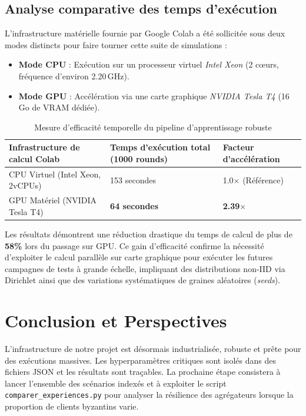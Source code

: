 \documentclass[11pt, a4paper]{article}
\begin{document}
\subsection{Analyse comparative des temps d'exécution}
L'infrastructure matérielle fournie par Google Colab a été sollicitée sous deux modes distincts pour faire tourner cette suite de simulations :
\begin{itemize}
    \item \textbf{Mode CPU} : Exécution sur un processeur virtuel \textit{Intel Xeon} (2 cœurs, fréquence d'environ 2.20\,GHz).
    \item \textbf{Mode GPU} : Accélération via une carte graphique \textit{NVIDIA Tesla T4} (16\,Go de VRAM dédiée).
\end{itemize}

\begin{table}[h]
\centering
\begin{tabularx}{\textwidth}{@{}lXX@{}}
\toprule
\textbf{Infrastructure de calcul Colab} & \textbf{Temps d'exécution total (1000 rounds)} & \textbf{Facteur d'accélération} \\ \midrule
CPU Virtuel (Intel Xeon, 2vCPUs)        & 153 secondes                                   & 1.0$\times$ (Référence)         \\ \addlinespace
GPU Matériel (NVIDIA Tesla T4)          & \textbf{64 secondes}                           & \textbf{2.39$\times$}           \\ \bottomrule
\end{tabularx}
\caption{Mesure d'efficacité temporelle du pipeline d'apprentissage robuste}
\end{table}

Les résultats démontrent une réduction drastique du temps de calcul de plus de \textbf{58\%} lors du passage sur GPU. Ce gain d'efficacité confirme la nécessité d'exploiter le calcul parallèle sur carte graphique pour exécuter les futures campagnes de tests à grande échelle, impliquant des distributions non-IID via Dirichlet ainsi que des variations systématiques de graines aléatoires (\textit{seeds}).

\section{Conclusion et Perspectives}
L'infrastructure de notre projet est désormais industrialisée, robuste et prête pour des exécutions massives. Les hyperparamètres critiques sont isolés dans des fichiers JSON et les résultats sont traçables. La prochaine étape consistera à lancer l'ensemble des scénarios indexés et à exploiter le script \texttt{comparer\_experiences.py} pour analyser la résilience des agrégateurs lorsque la proportion de clients byzantins varie.
\end{document}
